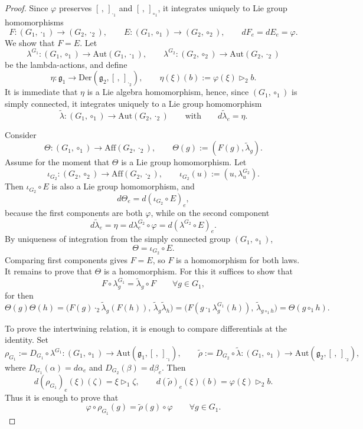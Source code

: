 \documentclass[reqno]{amsart}
\begin{document}
\begin{proof}
Since $\varphi$ preserves $[\,,\,]_{\cdot_1}$ and $[\,,\,]_{\circ_1}$, it integrates uniquely to Lie group
homomorphisms
\[
F:(G_1,\cdot_1)\to (G_2,\cdot_2),
\qquad
E:(G_1,\circ_1)\to (G_2,\circ_2),
\qquad
dF_e=dE_e=\varphi.
\]
We show that $F=E$. Let
\[
\lambda^{G_1}:(G_1,\circ_1)\to \mathrm{Aut}(G_1,\cdot_1),
\qquad
\lambda^{G_2}:(G_2,\circ_2)\to \mathrm{Aut}(G_2,\cdot_2)
\]
be the lambda-actions, and define
\[
\eta:\mathfrak g_1\to \mathrm{Der}(\mathfrak g_2,[\,,\,]_{\cdot_2}),
\qquad
\eta(\xi)(b):=\varphi(\xi)\triangleright_2 b .
\]
It is immediate that $\eta$ is a Lie algebra homomorphism, hence, since $(G_1,\circ_1)$ is simply
connected, it integrates uniquely to a Lie group homomorphism
\[
\widetilde{\lambda}:(G_1,\circ_1)\to \mathrm{Aut}(G_2,\cdot_2)
\qquad\text{with}\qquad
d\widetilde{\lambda}_e=\eta .
\]

Consider
\[
\Theta:(G_1,\circ_1)\to \mathrm{Aff}(G_2,\cdot_2),
\qquad
\Theta(g):=(F(g),\widetilde{\lambda}_g).
\]
Assume for the moment that $\Theta$ is a Lie group homomorphism. Let
\[
\iota_{G_2}:(G_2,\circ_2)\to \mathrm{Aff}(G_2,\cdot_2),
\qquad
\iota_{G_2}(u):=(u,\lambda^{G_2}_u).
\]
Then $\iota_{G_2}\circ E$ is also a Lie group homomorphism, and
\[
d\Theta_e=d(\iota_{G_2}\circ E)_e,
\]
because the first components are both $\varphi$, while on the second component
\[
d\widetilde{\lambda}_e=\eta=d\lambda^{G_2}_e\circ \varphi=d(\lambda^{G_2}\circ E)_e.
\]
By uniqueness of integration from the simply connected group $(G_1,\circ_1)$,
\[
\Theta=\iota_{G_2}\circ E.
\]
Comparing first components gives $F=E$, so $F$ is a homomorphism for both laws. It remains to prove that $\Theta$ is a homomorphism. For this it suffices to show that
\[
F\circ \lambda^{G_1}_g=\widetilde{\lambda}_g\circ F
\qquad\forall g\in G_1,
\]
for then
\[
\Theta(g)\Theta(h)
=
\bigl(F(g)\cdot_2 \widetilde{\lambda}_g(F(h)),\,\widetilde{\lambda}_g\widetilde{\lambda}_h\bigr)
=
\bigl(F(g\cdot_1 \lambda^{G_1}_g(h)),\,\widetilde{\lambda}_{g\circ_1 h}\bigr)
=
\Theta(g\circ_1 h).
\]

To prove the intertwining relation, it is enough to compare differentials at the identity. Set
\[
\rho_{G_1}:=D_{G_1}\circ \lambda^{G_1}:(G_1,\circ_1)\to \mathrm{Aut}(\mathfrak g_1,[\,,\,]_{\cdot_1}),
\qquad
\widetilde{\rho}:=D_{G_2}\circ \widetilde{\lambda}:(G_1,\circ_1)\to \mathrm{Aut}(\mathfrak g_2,[\,,\,]_{\cdot_2}),
\]
where $D_{G_1}(\alpha)=d\alpha_e$ and $D_{G_2}(\beta)=d\beta_e$. Then
\[
d(\rho_{G_1})_e(\xi)(\zeta)=\xi\triangleright_1 \zeta,
\qquad
d(\widetilde{\rho})_e(\xi)(b)=\varphi(\xi)\triangleright_2 b.
\]
Thus it is enough to prove that
\[
\varphi\circ \rho_{G_1}(g)=\widetilde{\rho}(g)\circ \varphi
\qquad\forall g\in G_1.
\]


\end{proof}
\end{document}
